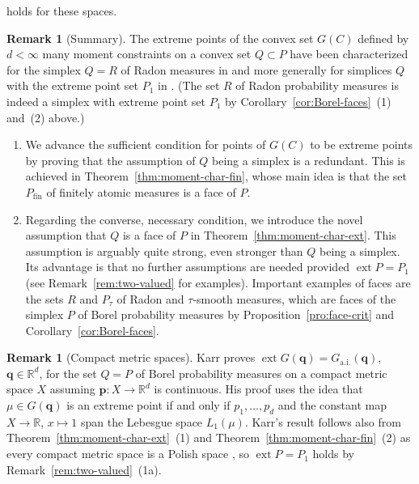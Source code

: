 \documentclass[a4paper,11pt,reqno]{amsart}
\numberwithin{equation}{section}
\theoremstyle{plain}
\theoremstyle{definition}
\newtheorem{remark}[theorem]{Remark}
\newcommand{\bp}{\mathbf{p}}
\newcommand{\bq}{\mathbf{q}}
\newcommand{\R}{\mathbb{R}} %
\DeclareMathOperator{\ext}{ext} %
\newcommand\ait{\mathrm{a.i.}}
\newcommand\fint{\mathrm{fin}}
\begin{document}
holds for these spaces.
\par
%
\begin{remark}[Summary]\label{rem:ext-moment-contribution}
The extreme points of the convex set $G(C)$ defined by $d<\infty$ many moment constraints 
on a convex set $Q\subset P$ have been characterized for the simplex $Q=R$ of Radon measures 
in \cite[Proposition~5]{weizsaecker-winkler80} and more generally for simplices $Q$ with 
the extreme point set $P_1$ in \cite[Theorem~2.1]{winkler88}. 
(The set $R$ of Radon probability measures is indeed a simplex with extreme point set $P_1$ 
by Corollary~\ref{cor:Borel-faces}~(1) and~(2) above.)
\begin{enumerate}
\item
We advance the sufficient condition for points of $G(C)$ to be extreme points by proving 
that the assumption of $Q$ being a simplex is a redundant. This is achieved in 
Theorem~\ref{thm:moment-char-fin}, whose main idea is that the set $P\!_\fint$ of finitely 
atomic measures is a face of $P$.
%
\item  
Regarding the converse, necessary condition, we introduce the novel assumption that $Q$ is 
a face of $P$ in Theorem~\ref{thm:moment-char-ext}. This assumption is arguably quite strong, 
even stronger than $Q$ being a simplex. Its advantage is that no further assumptions are 
needed provided $\ext P=P_1$ (see Remark~\ref{rem:two-valued} for examples). Important 
examples of faces are the sets $R$ and $P\!_\tau$ of Radon and $\tau$-smooth measures, which 
are faces of the simplex $P$ of Borel probability measures by Proposition~\ref{pro:face-crit} 
and Corollary~\ref{cor:Borel-faces}.
\end{enumerate}
\end{remark}
%
\begin{remark}[Compact metric spaces]\label{rem:Karr}
Karr \cite{karr83} proves $\ext G(\bq)=G_\ait(\bq)$, $\bq\in\R^d$, for the set $Q=P$ of Borel 
probability measures on a compact metric space $X$ assuming $\bp\colon X\to\R^d$ is continuous. 
His proof uses the idea  \cite{douglas64} that $\mu\in G(\bq)$ is an extreme point if and only 
if $p_1,\dots,p_d$ and the constant map $X\to\R$, $x\mapsto 1$ span the Lebesgue space $L_1(\mu)$. 
Karr's result follows also from Theorem~\ref{thm:moment-char-ext}~(1) and 
Theorem~\ref{thm:moment-char-fin}~(2) as every compact metric space is a Polish space 
\cite[Theorem~32 in Chapter~6]{kelley75}, so $\ext P=P_1$ holds by Remark~\ref{rem:two-valued}~(1a).
\end{remark}
%
%
\end{document}
